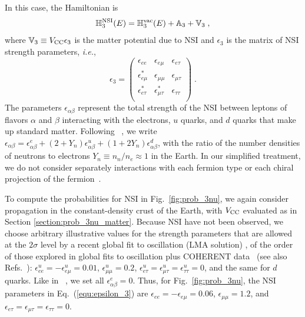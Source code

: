 \documentclass[final,5p,times,twocolumn]{elsarticle}
\newcommand{\ie}{{\it i.e.}}
\newcommand{\eq}{Eq.}
\newcommand{\fig}{Fig.}
\providecommand{\Ref}{} %
\newcommand{\Refs}{Refs.}
\newcommand{\equ}[1]{\eq~(\ref{equ:#1})}
\newcommand{\figu}[1]{\fig~\ref{fig:#1}}
\providecommand{\DIFaddtex}[1]{{\protect\color{blue} \sf #1}} %
\providecommand{\DIFdeltex}[1]{{\protect\color{red} \scriptsize #1}} %
\providecommand{\DIFaddbegin}{} %
\providecommand{\DIFaddend}{} %
\providecommand{\DIFdelbegin}{} %
\providecommand{\DIFdelend}{} %
\providecommand{\DIFadd}[1]{\DIFaddtex{#1}} %
\providecommand{\DIFdel}[1]{\DIFdeltex{#1}} %
\begin{document}
In this case, the Hamiltonian is
\begin{equation}
 \label{equ:h3_nsi}
 \mathbb{H}_3^{\rm NSI}(E)
 =
 \mathbb{H}_3^{\rm vac}(E) + \mathbb{A}_3 + \mathbb{V}_3  \;,
\end{equation}
where $\mathbb{V}_3 \equiv V_{\rm CC} \epsilon_3$ is the matter potential due to NSI and $\epsilon_3$ is the matrix of NSI strength parameters, \ie,
\begin{equation}
 \label{equ:epsilon_3}
 \epsilon_3
 =
 \left(
  \begin{array}{ccc}
   \epsilon_{ee}         & \epsilon_{e\mu}         & \epsilon_{e\tau} \\
   \epsilon_{e\mu}^\ast  & \epsilon_{\mu\mu}       & \epsilon_{\mu\tau} \\
   \epsilon_{e\tau}^\ast & \epsilon_{\mu\tau}^\ast & \epsilon_{\tau\tau} \\
  \end{array}
 \right) \;.
\end{equation}
The parameters $\epsilon_{\alpha\beta}$ represent the total strength of the NSI between leptons of flavors $\alpha$ and $\beta$ interacting with the electrons, $u$ quarks, and $d$ quarks that make up standard matter.  Following \Ref\ \cite{Esteban:2018ppq}, we write $\epsilon_{\alpha\beta} = \epsilon_{\alpha\beta}^e + (2+ Y_n)\epsilon_{\alpha\beta}^u + (1+2Y_n)\epsilon_{\alpha\beta}^d$, with the ratio of the number densities of neutrons to electrons $Y_n \equiv n_n/n_e \approx 1$ in the Earth.  In our simplified treatment, we do not consider separately interactions with each fermion type or each chiral projection of the fermion\ \cite{Ohlsson:2012kf, Miranda:2015dra, Farzan:2017xzy, Esteban:2018ppq}.  

To compute the probabilities for NSI in \figu{prob_3nu}, we again consider propagation in the constant-density crust of the Earth, with $V_{\rm CC}$ evaluated as in Section \ref{section:prob_3nu_matter}.  Because NSI have not been observed, we choose \DIFdelbegin \DIFdel{arbitrary }\DIFdelend \DIFaddbegin \DIFadd{illustrative }\DIFaddend values for the strength parameters\DIFdelbegin \DIFdel{that are allowed at the $2\sigma$ level by a recent global fit to oscillation (LMA solution) }\DIFdelend \DIFaddbegin \DIFadd{, of the order of those explored in global fits to oscillation }\DIFaddend plus COHERENT data\ \cite{Esteban:2018ppq} (see also \Refs\ \cite{Mitsuka:2011ty, Esmaili:2013fva, Salvado:2016uqu, Aartsen:2017xtt}): $\epsilon_{ee}^u = -\epsilon_{e\mu}^u = 0.01$, $\epsilon_{\mu\mu}^u = 0.2$, $\epsilon_{e\tau}^u = \epsilon_{\mu\tau}^u = \epsilon_{\tau\tau}^u = 0$, and the same for $d$ quarks.  Like in \Ref\ \cite{Esteban:2018ppq}, we set all $\epsilon_{\alpha\beta}^e = 0$.  Thus, for \figu{prob_3nu}, the NSI parameters in \equ{epsilon_3} are $\epsilon_{ee} = -\epsilon_{e\mu} = 0.06$, $\epsilon_{\mu\mu} = 1.2$, and $\epsilon_{e\tau} = \epsilon_{\mu\tau} = \epsilon_{\tau\tau} = 0$.
\end{document}
